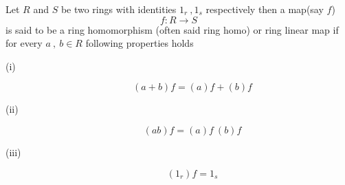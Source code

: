 \begin{definition}
	Let $R$ and $S$ be two rings with identities $1_r \ , 1_s$ respectively then a map(say $f$)
	\begin{equation*}
	f : R \rightarrow S
	\end{equation*}
	is said to be a ring homomorphism (often said ring homo) or ring linear map if for every $a \ ,\ b \in R$ following properties holds
	\begin{description}
		\item[(i)]\begin{equation*}
		(a+b)f = (a)f +(b)f
		\end{equation*}
		\item[(ii)]\begin{equation*}
		(ab)f = (a)f \ (b)f
		\end{equation*}
		\item[(iii)]\begin{equation*}
		(1_r)f = 1_s
		\end{equation*}
	\end{description}
\end{definition}
